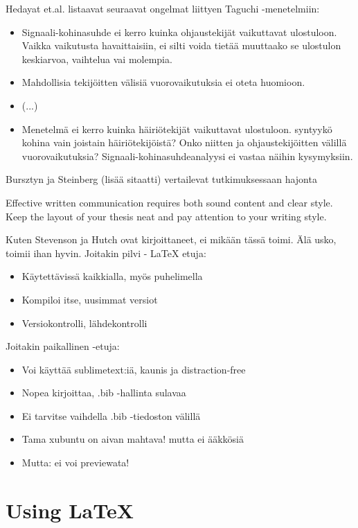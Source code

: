 \documentclass[12pt,a4paper,finnish]{tutthesis}
\begin{document}
Hedayat et.al. \parencite{hedayat2012orthogonal} listaavat
seuraavat ongelmat liittyen
Taguchi -menetelmiin:
\begin{itemize}
\item Signaali-kohinasuhde ei kerro kuinka ohjaustekijät vaikuttavat
      ulostuloon. Vaikka vaikutusta havaittaisiin, ei silti voida tietää
      muuttaako se ulostulon keskiarvoa, vaihtelua vai molempia. 
\item Mahdollisia tekijöitten välisiä vuorovaikutuksia ei oteta huomioon.
\item (...)
\item Menetelmä ei kerro kuinka häiriötekijät vaikuttavat ulostuloon.
      syntyykö kohina vain joistain häiriötekijöistä? Onko niitten ja
      ohjaustekijöitten välillä vuorovaikutuksia? Signaali-kohinasuhdeanalyysi
      ei vastaa näihin kysymyksiin.
\end{itemize}

Bursztyn ja Steinberg (lisää sitaatti) vertailevat tutkimuksessaan hajonta



Effective written communication requires both sound content and clear
style. Keep the layout of your thesis neat and pay attention to your
writing style.

Kuten Stevenson ja Hutch \parencite{rubberwheel} ovat kirjoittaneet,
ei mikään tässä toimi. Älä usko, toimii ihan hyvin. Joitakin pilvi - \LaTeX
etuja:
\begin{itemize}
\item Käytettävissä kaikkialla, myös puhelimella
\item Kompiloi itse, uusimmat versiot
\item Versiokontrolli, lähdekontrolli
\end{itemize}

Joitakin paikallinen \LaTeXe -etuja:
\begin{itemize}
\item Voi käyttää sublimetext:iä, kaunis ja distraction-free
\item Nopea kirjoittaa, .bib -hallinta sulavaa
\item Ei tarvitse vaihdella .bib -tiedoston välillä
\item Tama xubuntu on aivan mahtava! mutta ei \"a\"akk\"osi\"a
\item Mutta: ei voi previewata!
\end{itemize}
\section{Using LaTeX}
\end{document}
